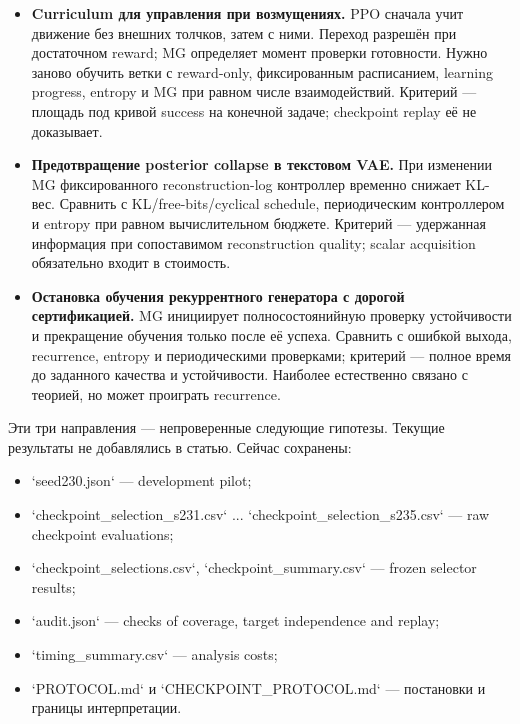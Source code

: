 \documentclass[10pt,a4paper]{article}
\begin{document}
\begin{itemize}
\item \textbf{Curriculum для управления при возмущениях.} PPO сначала учит движение без внешних толчков, затем с ними. Переход разрешён при достаточном reward; MG определяет момент проверки готовности. Нужно заново обучить ветки с reward-only, фиксированным расписанием, learning progress, entropy и MG при равном числе взаимодействий. Критерий --- площадь под кривой success на конечной задаче; checkpoint replay её не доказывает.
\item \textbf{Предотвращение posterior collapse в текстовом VAE.} При изменении MG фиксированного reconstruction-log контроллер временно снижает KL-вес. Сравнить с KL/free-bits/cyclical schedule, периодическим контроллером и entropy при равном вычислительном бюджете. Критерий --- удержанная информация при сопоставимом reconstruction quality; scalar acquisition обязательно входит в стоимость.
\item \textbf{Остановка обучения рекуррентного генератора с дорогой сертификацией.} MG инициирует полносостоянийную проверку устойчивости и прекращение обучения только после её успеха. Сравнить с ошибкой выхода, recurrence, entropy и периодическими проверками; критерий --- полное время до заданного качества и устойчивости. Наиболее естественно связано с теорией, но может проиграть recurrence.
\end{itemize}

Эти три направления --- непроверенные следующие гипотезы. Текущие результаты не добавлялись в статью. Сейчас сохранены:

\begin{itemize}
\item `seed230.json` --- development pilot;
\item `checkpoint\_selection\_s231.csv` ... `checkpoint\_selection\_s235.csv` --- raw checkpoint evaluations;
\item `checkpoint\_selections.csv`, `checkpoint\_summary.csv` --- frozen selector results;
\item `audit.json` --- checks of coverage, target independence and replay;
\item `timing\_summary.csv` --- analysis costs;
\item `PROTOCOL.md` и `CHECKPOINT\_PROTOCOL.md` --- постановки и границы интерпретации.
\end{itemize}
\end{document}
